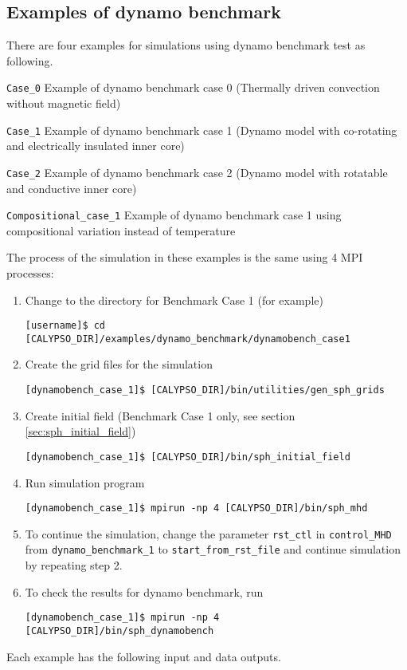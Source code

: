 \subsection{Examples of dynamo benchmark}
\label{section:dynamobench}
There are four examples for simulations using dynamo benchmark test as following.
%
\begin{description}
\item{\tt Case\_0} Example of dynamo benchmark case 0 (Thermally driven convection without magnetic field)
\item{\tt Case\_1} Example of dynamo benchmark case 1 (Dynamo model with co-rotating and electrically insulated inner core)
\item{\tt Case\_2} Example of dynamo benchmark case 2 (Dynamo model with rotatable and conductive inner core)
\item{\tt Compositional\_case\_1} Example of dynamo benchmark case 1 using compositional variation instead of temperature
\end{description}
%
The process of the simulation in these examples is the same using 4 MPI processes:
%
\begin{enumerate}
\item Change to the directory for Benchmark Case 1 (for example) \\
{\small
\begin{verbatim}
[username]$ cd [CALYPSO_DIR]/examples/dynamo_benchmark/dynamobench_case1
\end{verbatim}
}

\item  Create the grid files for the simulation  \\
{\small
\begin{verbatim}
[dynamobench_case_1]$ [CALYPSO_DIR]/bin/utilities/gen_sph_grids
\end{verbatim}
}

\item  Create initial field (Benchmark Case 1 only, see section \ref{sec:sph_initial_field}) \\
{\small
\begin{verbatim}
[dynamobench_case_1]$ [CALYPSO_DIR]/bin/sph_initial_field
\end{verbatim}
}

\item  Run simulation program
{\small
\begin{verbatim}
[dynamobench_case_1]$ mpirun -np 4 [CALYPSO_DIR]/bin/sph_mhd
\end{verbatim}
}

\item  To continue the simulation, change the parameter \verb|rst_ctl| in \verb|control_MHD| from \verb|dynamo_benchmark_1| to \verb|start_from_rst_file| and continue simulation by repeating step 2.

\item  To check the results for dynamo benchmark, run 
{\small
\begin{verbatim}
[dynamobench_case_1]$ mpirun -np 4 [CALYPSO_DIR]/bin/sph_dynamobench
\end{verbatim}
}
\end{enumerate}
Each example has the following input and data outputs.
%
